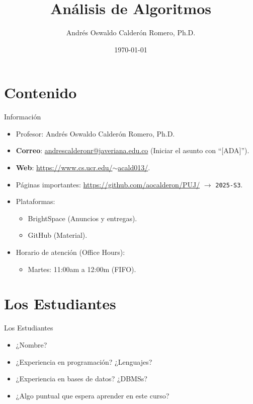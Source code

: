 \documentclass{beamer}
\title{Análisis de Algoritmos}
\author{Andrés Oswaldo Calderón Romero, Ph.D.}
\date{\today}
\begin{document}
\frame{\titlepage}

\section{Contenido}

\begin{frame}{Información}
\begin{itemize}
    \item Profesor: Andrés Oswaldo Calderón Romero, Ph.D.
    \item \textbf{Correo}: \href{mailto:andrescalderonr@javeriana.edu.co}{andrescalderonr@javeriana.edu.co} (Iniciar el asunto con ``[ADA]'').
    \item \textbf{Web}: \href{https://www.cs.ucr.edu/~acald013/}{https://www.cs.ucr.edu/$\sim$acald013/}.
    \item Páginas importantes: \url{https://github.com/aocalderon/PUJ/} $\longrightarrow$ \texttt{2025-S3}.
    \item Plataformas: 
    \begin{itemize}
        \item BrightSpace (Anuncios y entregas).
        \item GitHub (Material).
    \end{itemize}
    \item Horario de atención (Office Hours):
    \begin{itemize}
        \item Martes: 11:00am a 12:00m (FIFO).
    \end{itemize}
\end{itemize}
\end{frame}

\section{Los Estudiantes}

\begin{frame}{Los Estudiantes}
\begin{itemize}
    \item ¿Nombre? 
    \item ¿Experiencia en programación? ¿Lenguajes? 
    \item ¿Experiencia en bases de datos? ¿DBMSs?
    \item ¿Algo puntual que espera aprender en este curso?
\end{itemize}
\end{frame}
\end{document}
